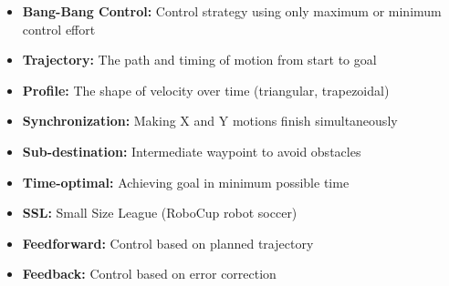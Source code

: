 \documentclass[12pt,a4paper]{article}
\begin{document}
\begin{itemize}
    \item \textbf{Bang-Bang Control:} Control strategy using only maximum or minimum control effort
    \item \textbf{Trajectory:} The path and timing of motion from start to goal
    \item \textbf{Profile:} The shape of velocity over time (triangular, trapezoidal)
    \item \textbf{Synchronization:} Making X and Y motions finish simultaneously
    \item \textbf{Sub-destination:} Intermediate waypoint to avoid obstacles
    \item \textbf{Time-optimal:} Achieving goal in minimum possible time
    \item \textbf{SSL:} Small Size League (RoboCup robot soccer)
    \item \textbf{Feedforward:} Control based on planned trajectory
    \item \textbf{Feedback:} Control based on error correction
\end{itemize}
\end{document}
